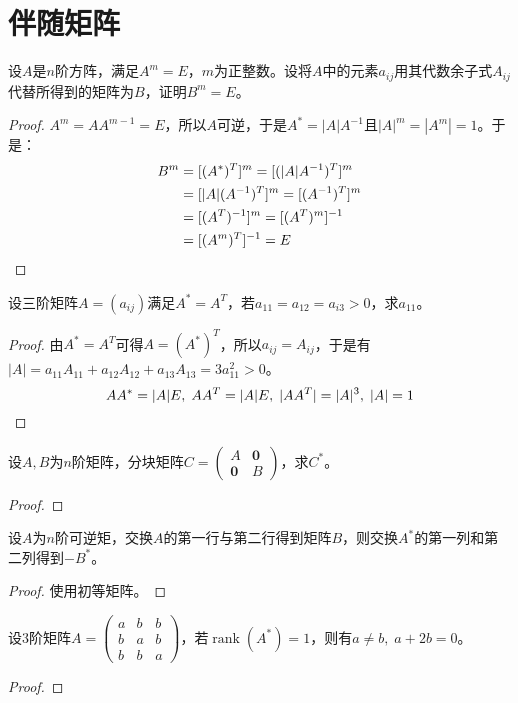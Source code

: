 \section{伴随矩阵}
\begin{theorem}
	设$A$是$n$阶方阵，满足$A^m=E$，$m$为正整数。设将$A$中的元素$a_{ij}$用其代数余子式$A_{ij}$代替所得到的矩阵为$B$，证明$B^m=E$。
\end{theorem}
\begin{proof}
	$A^m=AA^{m-1}=E$，所以$A$可逆，于是$A^*=|A|A^{-1}$且$|A|^m=|A^m|=1$。于是：
	\begin{align*}
		B^m&=[(A^*)^T]^m=[(|A|A^{-1})^T]^m \\
		&=[|A|(A^{-1})^T]^m=[(A^{-1})^T]^m \\
		&=[(A^T)^{-1}]^m=[(A^T)^m]^{-1} \\
		&=[(A^m)^T]^{-1}=E\qedhere
	\end{align*}
\end{proof}
\begin{theorem}
	设三阶矩阵$A=(a_{ij})$满足$A^*=A^T$，若$a_{11}=a_{12}=a_{i3}>0$，求$a_{11}$。
\end{theorem}
\begin{proof}
	由$A^*=A^T$可得$A=(A^*)^T$，所以$a_{ij}=A_{ij}$，于是有$|A|=a_{11}A_{11}+a_{12}A_{12}+a_{13}A_{13}=3a_{11}^2>0$。
	\begin{equation*}
		AA^*=|A|E,\;AA^T=|A|E,\;|AA^T|=|A|^3,\;|A|=1\qedhere
	\end{equation*}
\end{proof}
\begin{theorem}
	设$A,B$为$n$阶矩阵，分块矩阵$C=\begin{pmatrix}
		A & \mathbf{0} \\
		\mathbf{0} & B
	\end{pmatrix}$，求$C^*$。
\end{theorem}
\begin{proof}
	
\end{proof}
\begin{theorem}
	设$A$为$n$阶可逆矩，交换$A$的第一行与第二行得到矩阵$B$，则交换$A^*$的第一列和第二列得到$-B^*$。
\end{theorem}
\begin{proof}
	使用初等矩阵。
\end{proof}
\begin{theorem}
	设$3$阶矩阵$A=\begin{pmatrix}
		a & b & b \\
		b & a & b \\
		b & b & a
	\end{pmatrix}$，若$\operatorname{rank}(A^*)=1$，则有$a\ne b,\;a+2b=0$。
\end{theorem}
\begin{proof}
	
\end{proof}

